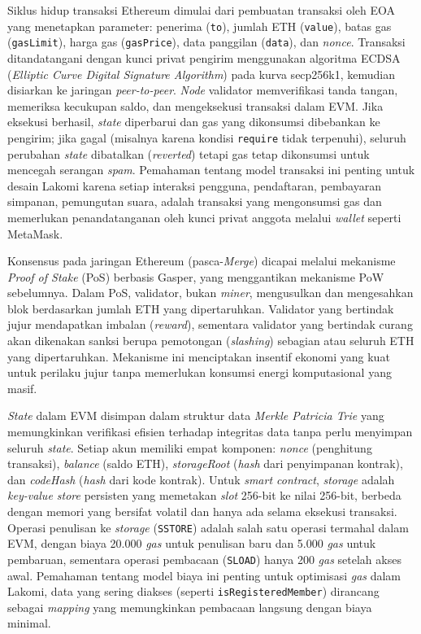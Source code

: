 Siklus hidup transaksi Ethereum dimulai dari pembuatan transaksi oleh EOA yang menetapkan parameter: penerima (\texttt{to}), jumlah ETH (\texttt{value}), batas gas (\texttt{gasLimit}), harga gas (\texttt{gasPrice}), data panggilan (\texttt{data}), dan \textit{nonce}. Transaksi ditandatangani dengan kunci privat pengirim menggunakan algoritma ECDSA (\textit{Elliptic Curve Digital Signature Algorithm}) pada kurva secp256k1, kemudian disiarkan ke jaringan \textit{peer-to-peer}. \textit{Node} validator memverifikasi tanda tangan, memeriksa kecukupan saldo, dan mengeksekusi transaksi dalam EVM. Jika eksekusi berhasil, \textit{state} diperbarui dan gas yang dikonsumsi dibebankan ke pengirim; jika gagal (misalnya karena kondisi \texttt{require} tidak terpenuhi), seluruh perubahan \textit{state} dibatalkan (\textit{reverted}) tetapi gas tetap dikonsumsi untuk mencegah serangan \textit{spam}. Pemahaman tentang model transaksi ini penting untuk desain Lakomi karena setiap interaksi pengguna, pendaftaran, pembayaran simpanan, pemungutan suara, adalah transaksi yang mengonsumsi gas dan memerlukan penandatanganan oleh kunci privat anggota melalui \textit{wallet} seperti MetaMask.

Konsensus pada jaringan Ethereum (pasca-\textit{Merge}) dicapai melalui mekanisme \textit{Proof of Stake} (PoS) berbasis Gasper, yang menggantikan mekanisme PoW sebelumnya. Dalam PoS, validator, bukan \textit{miner}, mengusulkan dan mengesahkan blok berdasarkan jumlah ETH yang dipertaruhkan. Validator yang bertindak jujur mendapatkan imbalan (\textit{reward}), sementara validator yang bertindak curang akan dikenakan sanksi berupa pemotongan (\textit{slashing}) sebagian atau seluruh ETH yang dipertaruhkan. Mekanisme ini menciptakan insentif ekonomi yang kuat untuk perilaku jujur tanpa memerlukan konsumsi energi komputasional yang masif.

\textit{State} dalam EVM disimpan dalam struktur data \textit{Merkle Patricia Trie} yang memungkinkan verifikasi efisien terhadap integritas data tanpa perlu menyimpan seluruh \textit{state}. Setiap akun memiliki empat komponen: \textit{nonce} (penghitung transaksi), \textit{balance} (saldo ETH), \textit{storageRoot} (\textit{hash} dari penyimpanan kontrak), dan \textit{codeHash} (\textit{hash} dari kode kontrak). Untuk \textit{smart contract}, \textit{storage} adalah \textit{key-value store} persisten yang memetakan \textit{slot} 256-bit ke nilai 256-bit, berbeda dengan memori yang bersifat volatil dan hanya ada selama eksekusi transaksi. Operasi penulisan ke \textit{storage} (\texttt{SSTORE}) adalah salah satu operasi termahal dalam EVM, dengan biaya 20.000 \textit{gas} untuk penulisan baru dan 5.000 \textit{gas} untuk pembaruan, sementara operasi pembacaan (\texttt{SLOAD}) hanya 200 \textit{gas} setelah akses awal. Pemahaman tentang model biaya ini penting untuk optimisasi \textit{gas} dalam Lakomi, data yang sering diakses (seperti \texttt{isRegisteredMember}) dirancang sebagai \textit{mapping} yang memungkinkan pembacaan langsung dengan biaya minimal.


